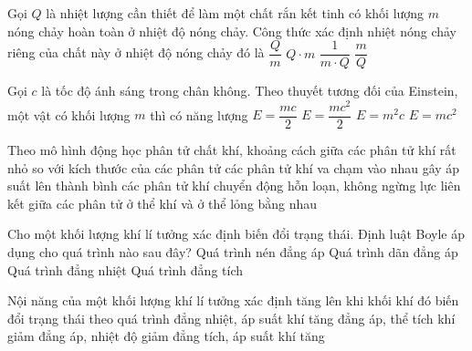 	\begin{ex}%
		Gọi $Q$ là nhiệt lượng cần thiết để làm một chất rắn kết tinh có khối lượng $m$ nóng chảy hoàn toàn ở nhiệt độ nóng chảy. Công thức xác định nhiệt nóng chảy riêng của chất này ở nhiệt độ nóng chảy đó là
		\choice
		{\True $\dfrac{Q}{m}$}
		{$Q\cdot m$}
		{$\dfrac{1}{m\cdot Q}$}
		{$\dfrac{m}{Q}$}
	\end{ex}

	\begin{ex}%
		Gọi $c$ là tốc độ ánh sáng trong chân không. Theo thuyết tương đối của Einstein, một vật có khối lượng $m$ thì có năng lượng
		\choice
		{$E=\dfrac{mc}{2}$}
		{$E=\dfrac{mc^2}{2}$}
		{$E=m^2c$}
		{\True $E=mc^2$}
	\end{ex}

	\begin{ex}%
		Theo mô hình động học phân tử chất khí,
		\choice
		{khoảng cách giữa các phân tử khí rất nhỏ so với kích thước của các phân tử}
		{các phân tử khí va chạm vào nhau gây áp suất lên thành bình}
		{\True các phân tử khí chuyển động hỗn loạn, không ngừng}
		{lực liên kết giữa các phân tử ở thể khí và ở thể lỏng bằng nhau}
	\end{ex}

	\begin{ex}%
		Cho một khối lượng khí lí tưởng xác định biến đổi trạng thái. Định luật Boyle áp dụng cho quá trình nào sau đây?
		\choice
		{Quá trình nén đẳng áp}
		{Quá trình dãn đẳng áp}
		{\True Quá trình đẳng nhiệt}
		{Quá trình đẳng tích}
	\end{ex}

	\begin{ex}%
		Nội năng của một khối lượng khí lí tưởng xác định tăng lên khi khối khí đó biến đổi trạng thái theo quá trình
		\choice
		{đẳng nhiệt, áp suất khí tăng}
		{đẳng áp, thể tích khí giảm}
		{đẳng áp, nhiệt độ giảm}
		{\True đẳng tích, áp suất khí tăng}
	\end{ex}

